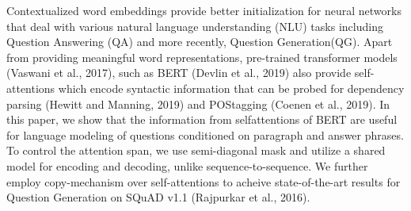 Contextualized word embeddings provide better initialization for neural networks that deal with various natural language understanding (NLU) tasks including Question Answering (QA) and more recently, Question Generation(QG). Apart from providing meaningful word representations, pre-trained transformer models (Vaswani et al., 2017), such as BERT (Devlin et al., 2019) also provide self-attentions which encode syntactic information that can be probed for dependency parsing (Hewitt and Manning, 2019) and POStagging (Coenen et al., 2019). In this paper, we show that the information from selfattentions of BERT are useful for language modeling of questions conditioned on paragraph and answer phrases. To control the attention span, we use semi-diagonal mask and utilize a shared model for encoding and decoding, unlike sequence-to-sequence. We further employ copy-mechanism over self-attentions to acheive state-of-the-art results for Question Generation on SQuAD v1.1 (Rajpurkar et al., 2016).
